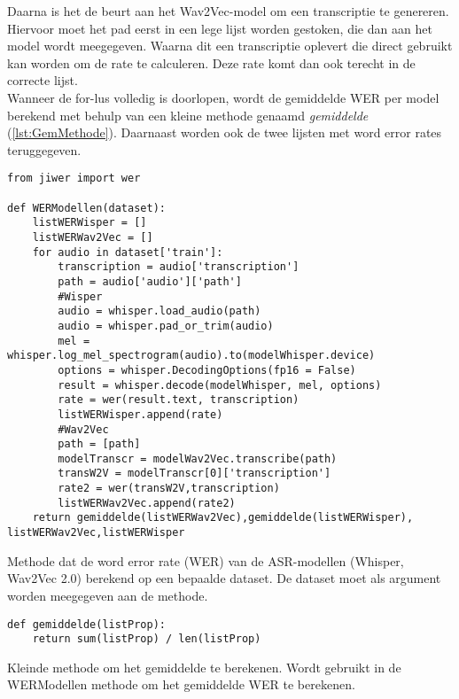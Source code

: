 Daarna is het de beurt aan het Wav2Vec-model om een transcriptie te genereren. Hiervoor moet het pad eerst in een lege lijst worden gestoken, die dan aan het model wordt meegegeven. Waarna dit een transcriptie oplevert die direct gebruikt kan worden om de rate te calculeren. Deze rate komt dan ook terecht in de correcte lijst.\\

Wanneer de for-lus volledig is doorlopen, wordt de gemiddelde WER per model berekend met behulp van een kleine methode genaamd \emph{gemiddelde} (\ref{lst:GemMethode}). Daarnaast worden ook de twee lijsten met word error rates teruggegeven.

\begin{listing}[H]
    \begin{verbatim}
from jiwer import wer

def WERModellen(dataset):
    listWERWisper = []
    listWERWav2Vec = []
    for audio in dataset['train']:
        transcription = audio['transcription']
        path = audio['audio']['path']
        #Wisper
        audio = whisper.load_audio(path)
        audio = whisper.pad_or_trim(audio)
        mel = whisper.log_mel_spectrogram(audio).to(modelWhisper.device)
        options = whisper.DecodingOptions(fp16 = False)
        result = whisper.decode(modelWhisper, mel, options)
        rate = wer(result.text, transcription)
        listWERWisper.append(rate)
        #Wav2Vec
        path = [path]
        modelTranscr = modelWav2Vec.transcribe(path)
        transW2V = modelTranscr[0]['transcription']
        rate2 = wer(transW2V,transcription)
        listWERWav2Vec.append(rate2)
    return gemiddelde(listWERWav2Vec),gemiddelde(listWERWisper), listWERWav2Vec,listWERWisper
\end{verbatim}
    \caption{Methode dat de word error rate (WER) van de ASR-modellen (Whisper, Wav2Vec 2.0) berekend op een bepaalde dataset. De dataset moet als argument worden meegegeven aan de methode.}
    \label{lst:WERMethode}
\end{listing}
\begin{listing}[H]
\begin{verbatim}
def gemiddelde(listProp):
    return sum(listProp) / len(listProp)
\end{verbatim}
\caption{Kleinde methode om het gemiddelde te berekenen. Wordt gebruikt in de WERModellen methode om het gemiddelde WER te berekenen.}
\label{lst:GemMethode}
\end{listing}
